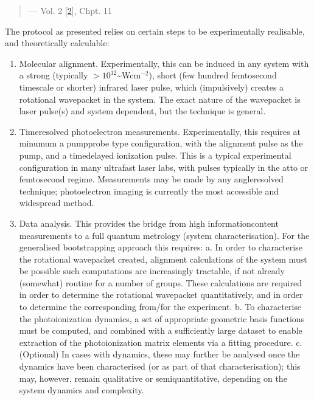 \documentclass[letterpaper,table,10pt,english]{jupyterBook}
\begin{document}
\begin{quote}
\begin{flushright}
--- Vol. 2 {[}\hyperlink{cite.backmatter/bibliography:id614}{2}{]}, Chpt. 11
\end{flushright}
\end{quote}

\sphinxAtStartPar
The protocol as presented relies on certain steps to be experimentally realisable, and theoretically calculable:
\begin{enumerate}
%
\item {} 
\sphinxAtStartPar
Molecular alignment. Experimentally, this can be induced in any system with a strong (typically \(>10^{12}\)\textasciitilde{}Wcm\(^{-2}\)), short (few hundred femtosecond timescale or shorter) infra\sphinxhyphen{}red laser pulse, which (impulsively) creates a rotational wavepacket in the system. The exact nature of the wavepacket is laser pulse(s) and system dependent, but the technique is general.

\item {} 
\sphinxAtStartPar
Time\sphinxhyphen{}resolved photoelectron measurements. Experimentally, this requires \sphinxhyphen{} at minumum \sphinxhyphen{} a pump\sphinxhyphen{}probe type configuration, with the alignment pulse as the pump, and a time\sphinxhyphen{}delayed ionization pulse. This is a typical experimental configuration in many ultrafast laser labs, with pulses typically in the atto\sphinxhyphen{} or femto\sphinxhyphen{}second regime. Measurements may be made by any angle\sphinxhyphen{}resolved technique; photoelectron imaging is currently the most accessible and widespread method.

\item {} 
\sphinxAtStartPar
Data analysis. This provides the bridge from high information\sphinxhyphen{}content measurements to a full quantum metrology (system characterisation). For the generalised bootstrapping approach this requires:
a. In order to characterise the rotational wavepacket created, alignment calculations of the system must be possible \sphinxhyphen{} such computations are increasingly tractable, if not already (somewhat) routine for a number of groups. These calculations are required in order to determine the rotational wavepacket quantitatively, and in order to determine the corresponding {\hyperref[\detokenize{backmatter/glossary:term-ADMs}]{}} from/for the experiment.
b. To characterise the  photoionization dynamics, a set of appropriate geometric basis functions must be computed, and combined with a sufficiently large dataset to enable extraction of the photoionization matrix elements via a fitting procedure.
c. (Optional) In cases with  dynamics, these may further be analysed once the  dynamics have been characterised (or as part of that characterisation); this may, however, remain qualitative or semi\sphinxhyphen{}quantitative, depending on the system dynamics and complexity.


\end{enumerate}
\end{document}
